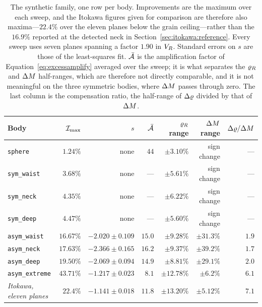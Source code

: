 \begin{table}[htbp]
\centering
\small
\setlength{\tabcolsep}{5pt}
\caption{The synthetic family, one row per body. Improvements are the
maximum over each sweep, and the Itokawa figures given for comparison are
therefore also maxima---$22.4\%$ over the eleven planes below the grain
ceiling---rather than the $16.9\%$ reported at the detected neck in
Section~\ref{sec:itokawa:reference}. Every sweep uses seven planes spanning
a factor $1.90$ in $V_{R}$. Standard errors on $s$ are those of the
least-squares fit. $\bar{\mathcal{A}}$ is the amplification factor of
Equation~\eqref{eq:excessamplify} averaged over the sweep; it is what
separates the $\varrho_{R}$ and $\Delta M$ half-ranges, which are therefore not
directly comparable, and it is not meaningful on the three symmetric bodies,
where $\Delta M$ passes through zero. The last column is the compensation
ratio, the half-range of $\Delta\varrho$ divided by that of $\Delta M$.}
\label{tab:synthetic}
\begin{tabular}{lrrrrrr}
\toprule
Body & $\mathcal{I}_{\max}$ & $s$ & $\bar{\mathcal{A}}$ & $\varrho_{R}$ range
 & $\Delta M$ range & $\Delta\varrho/\Delta M$ \\
\midrule
\texttt{sphere}        & $1.24\%$  & none & $44$ & $\pm3.10\%$ & sign change & --- \\
\texttt{sym\_waist}    & $3.68\%$  & none & ---  & $\pm5.61\%$ & sign change & --- \\
\texttt{sym\_neck}     & $4.35\%$  & none & ---  & $\pm6.22\%$ & sign change & --- \\
\texttt{sym\_deep}     & $4.47\%$  & none & ---  & $\pm5.60\%$ & sign change & --- \\
\addlinespace
\texttt{asym\_waist}   & $16.67\%$ & $-2.020\pm0.109$ & $15.0$ & $\pm9.28\%$  & $\pm31.3\%$ & $1.9$ \\
\texttt{asym\_neck}    & $17.63\%$ & $-2.366\pm0.165$ & $16.2$ & $\pm9.37\%$  & $\pm39.2\%$ & $1.7$ \\
\texttt{asym\_deep}    & $19.50\%$ & $-2.069\pm0.094$ & $14.9$ & $\pm8.81\%$  & $\pm29.1\%$ & $2.0$ \\
\texttt{asym\_extreme} & $43.71\%$ & $-1.217\pm0.023$ & $8.1$  & $\pm12.78\%$ & $\pm6.2\%$  & $6.1$ \\
\midrule
\itshape Itokawa, eleven planes & \itshape $22.4\%$ & \itshape $-1.141\pm0.018$
 & \itshape $11.8$ & \itshape $\pm13.20\%$ & \itshape $\pm5.12\%$
 & \itshape $7.1$ \\
\bottomrule
\end{tabular}
\end{table}

